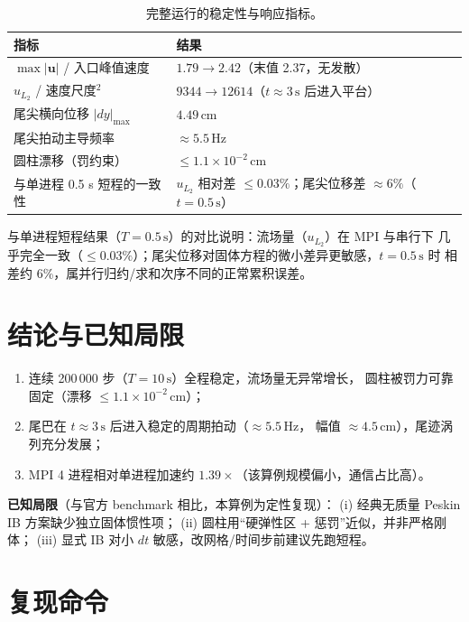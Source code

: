 \documentclass[11pt]{ctexart}
\newcommand{\cm}{\,\mathrm{cm}}
\begin{document}
\begin{table}[htbp]
  \centering
  \caption{完整运行的稳定性与响应指标。}
  \label{tab:metrics}
  \begin{tabular}{ll}
    \toprule
    指标 & 结果 \\
    \midrule
    $\max|\boldsymbol u|$ / 入口峰值速度 & $1.79 \to 2.42$（末值 2.37，无发散）\\
    $u_{L_2}$ / 速度尺度$^2$ & $9344 \to 12614$（$t\approx3\,\mathrm{s}$ 后进入平台）\\
    尾尖横向位移 $|dy|_{\max}$ & $4.49\cm$ \\
    尾尖拍动主导频率 & $\approx 5.5\,\mathrm{Hz}$ \\
    圆柱漂移（罚约束） & $\le 1.1\times10^{-2}\cm$ \\
    与单进程 0.5 s 短程的一致性 & $u_{L_2}$ 相对差 $\le0.03\%$；尾尖位移差 $\approx6\%$（$t=0.5\,\mathrm{s}$）\\
    \bottomrule
  \end{tabular}
\end{table}

与单进程短程结果（$T=0.5\,\mathrm{s}$）的对比说明：流场量（$u_{L_2}$）在 MPI 与串行下
几乎完全一致（$\le0.03\%$）；尾尖位移对固体方程的微小差异更敏感，$t=0.5\,\mathrm{s}$ 时
相差约 6\%，属并行归约/求和次序不同的正常累积误差。

\section{结论与已知局限}

\begin{enumerate}
  \item 连续 200\,000 步（$T=10\,\mathrm{s}$）全程稳定，流场量无异常增长，
        圆柱被罚力可靠固定（漂移 $\le1.1\times10^{-2}\cm$）；
  \item 尾巴在 $t\approx3\,\mathrm{s}$ 后进入稳定的周期拍动（$\approx5.5\,\mathrm{Hz}$，
        幅值 $\approx4.5\cm$），尾迹涡列充分发展；
  \item MPI 4 进程相对单进程加速约 $1.39\times$（该算例规模偏小，通信占比高）。
\end{enumerate}

\textbf{已知局限}（与官方 benchmark 相比，本算例为定性复现）：
(i) 经典无质量 Peskin IB 方案缺少独立固体惯性项；
(ii) 圆柱用``硬弹性区 + 惩罚''近似，并非严格刚体；
(iii) 显式 IB 对小 $dt$ 敏感，改网格/时间步前建议先跑短程。

\appendix
\section{复现命令}
\end{document}

